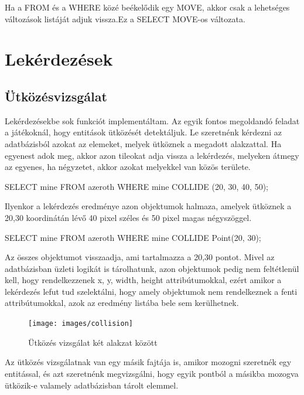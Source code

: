 \begin{sql}
Ha a FROM és a WHERE közé beékelődik egy MOVE, akkor csak a lehetséges változások listáját adjuk vissza.Ez a SELECT MOVE-os változata.

\section{Lekérdezések}

\subsection{Ütközésvizsgálat}

Lekérdezésekbe sok funkciót implementáltam. Az egyik fontos megoldandó feladat a játékoknál, hogy entitások ütközését detektáljuk. 
Le szeretnénk kérdezni az adatbázisból azokat az elemeket, melyek ütköznek a megadott alakzattal. Ha egyenest adok meg, akkor azon tileokat adja vissza a lekérdezés, melyeken átmegy az egyenes, ha négyzetet, akkor azokat melyekkel van közös területe.

\begin{sql}
SELECT mine
FROM azeroth
WHERE mine COLLIDE (20, 30, 40, 50);
\end{sql}

Ilyenkor a lekérdezés eredménye azon objektumok halmaza, amelyek ütköznek a 20,30 koordinátán lévő 40 pixel széles és 50 pixel magas négyszöggel.

\begin{sql}
SELECT mine
FROM azeroth
WHERE mine COLLIDE Point(20, 30);
\end{sql}

Az összes objektumot visszaadja, ami tartalmazza a 20,30 pontot. 
Mivel az adatbázisban üzleti logikát is tárolhatunk, azon objektumok pedig nem feltétlenül kell, hogy rendelkezzenek x, y, width, height attribútumokkal, ezért amikor a lekérdezés lefut tud szelektálni, hogy amely objektumok nem rendelkeznek a fenti attribútumokkal, azok az eredmény listába bele sem kerülhetnek.

\begin{figure}[htb]
\begin{center}
    \texttt{[image: images/collision]}
    \caption{Ütközés vizsgálat két alakzat között}
    \label{fig:collision}
\end{center}
\end{figure}

Az ütközés vizsgálatnak van egy másik fajtája is, amikor mozogni szeretnék egy entitással, és azt szeretnénk megvizsgálni, hogy egyik pontból a másikba mozogva ütközik-e valamely adatbázisban tárolt elemmel.


\end{sql}
